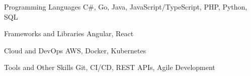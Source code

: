 
\begin{cvskills}

  \cvskill
    {Programming Languages}
    {C\#, Go, Java, JavaScript/TypeScript, PHP, Python, SQL}

  \cvskill
    {Frameworks and Libraries}
    {Angular, React}

  \cvskill
    {Cloud and DevOps}
    {AWS, Docker, Kubernetes}

  \cvskill
    {Tools and Other Skills}
    {Git, CI/CD, REST APIs, Agile Development}

\end{cvskills}
